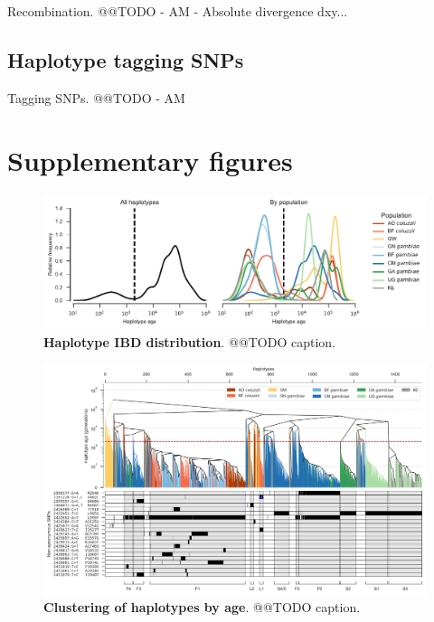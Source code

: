 \documentclass[a4paper,11pt,abstracton,hidelinks]{scrartcl}
\begin{document}
%
Recombination. @@TODO - AM - Absolute divergence dxy...


\subsection*{Haplotype tagging SNPs}

%
Tagging SNPs. @@TODO - AM


\section*{Supplementary figures}


%
\begin{figure}[!b]
  \includegraphics[width=1.1\linewidth,center]{artwork/haplotype_age_dist.pdf}
  \caption{\textbf{Haplotype IBD distribution}. @@TODO caption.}
  \label{fig:age_hist}
\end{figure}
 
 
%
\begin{figure}[!b]
  \includegraphics[width=1.1\linewidth,center]{artwork/fig_hap_tree.png}
  \caption{\textbf{Clustering of haplotypes by age}. @@TODO caption.}
  \label{fig:tree}
\end{figure}
\end{document}

